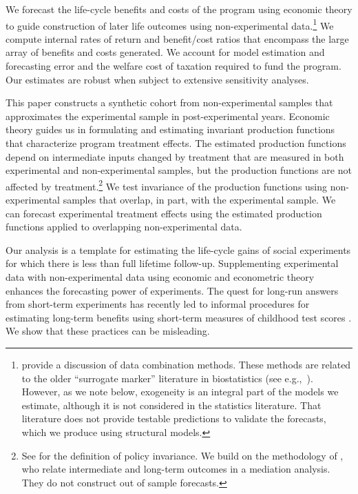 We forecast the life-cycle benefits and costs of the program using economic theory to guide construction of later life outcomes using non-experimental data.\footnote{\citet{Ridder_Moffitt_2007_hbk_metricsdata} provide a discussion of data combination methods. These methods are related to the older ``surrogate marker'' literature in biostatistics (see e.g.,\ \citealp{Prentice_1989_Surrogate_SiM}). However, as we note below, exogeneity is an integral part of the models we estimate, although it is not considered in the statistics literature. That literature does not provide testable predictions to validate the forecasts, which we produce using structural models.} We compute internal rates of return and benefit/cost ratios that encompass the large array of benefits and costs generated. We account for model estimation and forecasting error and the welfare cost of taxation required to fund the program. Our estimates are robust when subject to extensive sensitivity analyses.

This paper constructs a synthetic cohort from non-experimental samples that approximates the experimental sample in post-experimental years. Economic theory guides us in formulating and estimating invariant production functions that characterize program treatment effects. The estimated production functions depend on intermediate inputs changed by treatment that are measured in both experimental and non-experimental samples, but the production functions are not affected by treatment.\footnote{See \cite{Hurwicz_1962_structural} for the definition of policy invariance. We build on the methodology of \citet{Heckman_Pinto_etal_2013_PerryFactor}, who relate intermediate and long-term outcomes in a mediation analysis. They do not construct out of sample forecasts.} We test invariance of the production functions using non-experimental samples that overlap, in part, with the experimental sample. We can forecast experimental treatment effects using the estimated production functions applied to overlapping non-experimental data.

Our analysis is a template for estimating the life-cycle gains of social experiments for which there is less than full lifetime follow-up. Supplementing experimental data with non-experimental data using economic and econometric theory enhances the forecasting power of experiments. The quest for long-run answers from short-term experiments has recently led to informal procedures for estimating long-term benefits using short-term measures of childhood test scores \citep[e.g.][]{Kline_Walters_2016_QJE}. We show that these practices can be misleading.

